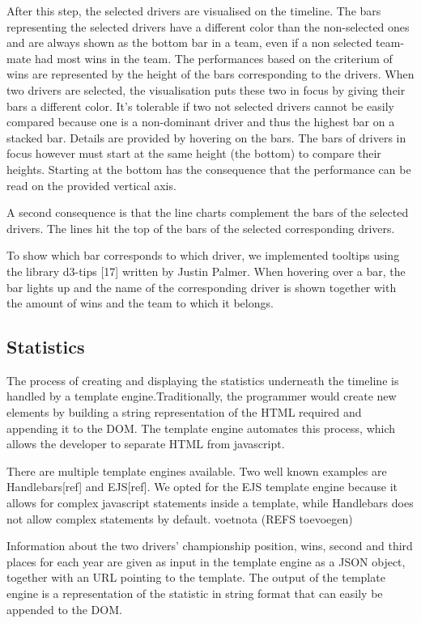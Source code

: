 \documentclass{sigchi}
\begin{document}
After this step, the selected drivers are visualised on the timeline. The bars representing the selected drivers have a different color than the non-selected ones and are always shown as the bottom bar in a team, even if a non selected team-mate had most wins in the team. The performances based on the criterium of wins are represented by the height of the bars corresponding to the drivers. When two drivers are selected, the visualisation puts these two in focus by giving their bars a different color. It's tolerable if two not selected drivers cannot be easily compared because one is a non-dominant driver and thus the highest bar on a stacked bar. Details are provided by hovering on the bars. The bars of drivers in focus however must start at the same height (the bottom) to compare their heights. Starting at the bottom has the consequence that the performance can be read on the provided vertical axis.


A second consequence is that the line charts complement the bars of the selected drivers. The lines hit the top of the bars of the selected corresponding drivers.

To show which bar corresponds to which driver, we implemented tooltips using the library d3-tips [17] written by Justin Palmer.
When hovering over a bar, the bar lights up and the name of the corresponding driver is shown together with the amount of wins and the team to which it belongs.


\subsection{Statistics} %
\label{sub:statistics}

The process of creating and displaying the statistics underneath the timeline is handled by a template engine.Traditionally, the programmer would create new elements by building a string representation of the HTML required and appending it to the DOM. The template engine automates this process, which allows the developer to separate HTML from javascript. 

There are multiple template engines available. Two well known examples are Handlebars[ref]  and EJS[ref]. We opted for the EJS template engine because it allows for complex javascript statements inside a template, while Handlebars does not allow complex statements by default. 
voetnota (REFS toevoegen)

Information about the two drivers’ championship position, wins, second and third places for each year are given as input in the template engine as a JSON object, together with an URL pointing to the template. The output of the template engine is a representation of the statistic in string format that can easily be appended to the DOM.
\end{document}
